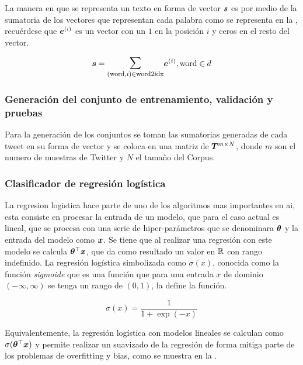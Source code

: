 La manera en que se representa un texto en forma de vector ${\bm{s}}$ es por medio de la sumatoria de los vectores que representan cada palabra como se representa en la , recuérdese que ${\bm{e}}^{(i)}$ es un vector con un $1$ en la posición $i$ y ceros en el resto del vector.

\begin{equation} \label{eq:bow-word-vector-sum}
  \vs = \mathlarger{\mathlarger{\sum}}_{(\text{word}, i) \in \text{word2idx}} \ve^{(i)}, \text{word} \in d
\end{equation}

\subsubsection{Generación del conjunto de entrenamiento, validación y pruebas}
Para la generación de los conjuntos se toman las sumatorias generadas de cada tweet en su forma de vector y se coloca en una matriz de ${\bm{T}}^{m \times N}$, donde $m$ son el numero de muestras de Twitter y $N$ el tamaño del Corpus.

\subsubsection{Clasificador de regresión logística}
La regresion logistica hace parte de uno de los algoritmos mas importantes en \gls{ai}, esta consiste en procesar la entrada de un modelo, que para el caso actual es lineal, que se procesa con una serie de hiper-parámetros que se denominara ${\bm{\theta}}$ y la entrada del modelo como ${\bm{x}}$. Se tiene que al realizar una regresión con este modelo se calcula ${\bm{\theta}}^{\top} {\bm{x}}$, que da como resultado un valor en $\mathbb{R}$ con rango indefinido. La regresión logística simbolizada como $\sigma(x)$, conocida como la función \emph{sigmoide} que es una función que para una entrada $x$ de dominio $(-\infty, \infty)$ se tenga un rango de $(0, 1)$, la  define la función.

\begin{equation} \label{eq:logits-formula}
  \sigma(x) = \frac{1} {1 + \exp(-x)}
\end{equation}

Equivalentemente, la regresión logística con modelos lineales se calculan como $\sigma({\bm{\theta}}^{\top} {\bm{x}})$ y permite realizar un suavizado de la regresión de forma mitiga parte de los problemas de \gls{overfitting} y \gls{bias}, como se muestra en la .

